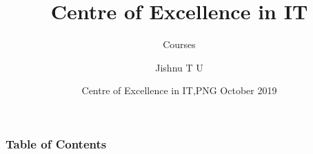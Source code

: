\documentclass[hyperref={bookmarks=false},aspectratio=169]{beamer}
\title[CEIT]
{\bfseries{Centre of Excellence in IT}}
\subtitle{Courses}
\author[Jishnu T U] %
{Jishnu T U\inst{1} } %
\institute[CEIT]
{
  \inst{1}
  Trainer\\
  Centre of Excellence in IT,PNG
}
\date[CEIT, 2014]
{Centre of Excellence in IT,PNG October 2019}
\begin{document}
\frame{\titlepage}  %

\begin{frame}
\frametitle{Table of Contents}
\tableofcontents
\end{frame}











%
%

%
\end{document}
